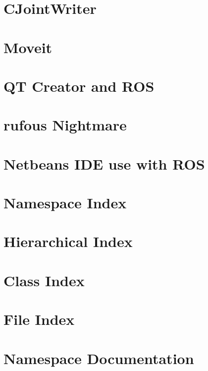 \documentclass[twoside]{book}
\begin{document}
\chapter{C\-Joint\-Writer}
\label{md_markdown_JointWriter}
\hypertarget{md_markdown_JointWriter}{}

\chapter{Moveit}
\label{md_markdown_MoveitRvizNotes}
\hypertarget{md_markdown_MoveitRvizNotes}{}

\chapter{Q\-T Creator and R\-O\-S}
\label{md_markdown_QtCreatorWIthRos}
\hypertarget{md_markdown_QtCreatorWIthRos}{}

\chapter{rufous Nightmare}
\label{md_markdown_rufousdiskproblem}
\hypertarget{md_markdown_rufousdiskproblem}{}

\chapter{Netbeans I\-D\-E use with R\-O\-S}
\label{md_markdown_Running_Netbeans_without_Environment_setup_properly}
\hypertarget{md_markdown_Running_Netbeans_without_Environment_setup_properly}{}

\chapter{Namespace Index}

\chapter{Hierarchical Index}

\chapter{Class Index}

\chapter{File Index}

\chapter{Namespace Documentation}





\end{document}
